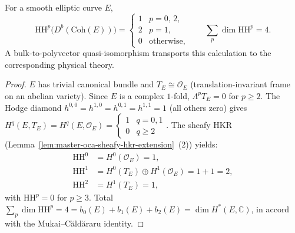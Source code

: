 \begin{corollary}
\label{cor:master-oca-bmodel-elliptic}
For a smooth elliptic curve $E$,
\[
\mathrm{HH}^p\bigl(D^b(\mathrm{Coh}(E))\bigr) =
\begin{cases}
1 & p = 0,\,2,\\
2 & p = 1,\\
0 & \text{otherwise,}
\end{cases}
\qquad \sum_p \dim \mathrm{HH}^p = 4.
\]
A bulk-to-polyvector quasi-isomorphism transports this calculation to
the corresponding physical theory.
\end{corollary}

\begin{proof}
$E$ has trivial canonical bundle and $T_E \cong \mathcal O_E$
\textup{(}translation-invariant frame on an abelian variety\textup{).}
Since $E$ is a complex $1$-fold, $\Lambda^p T_E = 0$ for $p \geq 2$.
The Hodge diamond
$h^{0,0} = h^{1,0} = h^{0,1} = h^{1,1} = 1$ \textup{(}all others
zero\textup{)} gives
$H^q(E, T_E) = H^q(E, \mathcal O_E) =
\begin{cases} 1 & q = 0, 1\\ 0 & q \geq 2\end{cases}$.
The sheafy HKR
\textup{(}Lemma~\ref{lem:master-oca-sheafy-hkr-extension}~\textup{(2)}\textup{)}
yields:
\begin{align*}
\mathrm{HH}^0 &= H^0(\mathcal O_E) = 1,\\
\mathrm{HH}^1 &= H^0(T_E) \oplus H^1(\mathcal O_E) = 1 + 1 = 2,\\
\mathrm{HH}^2 &= H^1(T_E) = 1,
\end{align*}
with $\mathrm{HH}^p = 0$ for $p \geq 3$. Total
$\sum_p \dim \mathrm{HH}^p = 4 = b_0(E) + b_1(E) + b_2(E) =
\dim H^*(E, \mathbb C)$, in accord with the Mukai--C{\u a}ld{\u a}raru
identity.
\end{proof}

